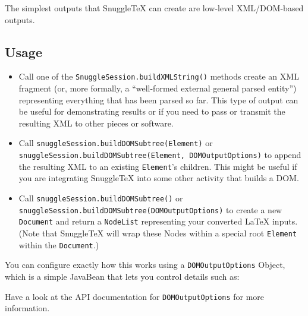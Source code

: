 
The simplest outputs that SnuggleTeX can create are low-level XML/DOM-based outputs.

\subsection*{Usage}

\begin{itemize}
  \item
    Call one of the \verb|SnuggleSession.buildXMLString()| methods create an XML fragment
    (or, more formally, a ``well-formed external general parsed entity'')
    representing everything that has been parsed so far.
    This type of output can be useful for demonstrating results or if you need to pass or
    transmit the resulting XML to other pieces or software.

  \item
    Call \verb|snuggleSession.buildDOMSubtree(Element)|
    or \verb|snuggleSession.buildDOMSubtree(Element, DOMOutputOptions)|
    to append the resulting XML to an existing \verb|Element|'s children.
    This might be useful if you are integrating SnuggleTeX into some other activity
    that builds a DOM.

  \item
    Call \verb|snuggleSession.buildDOMSubtree()|
    or \verb|snuggleSession.buildDOMSubtree(DOMOutputOptions)|
    to create a new \verb|Document| and return a \verb|NodeList| representing
    your converted LaTeX inputs. (Note that SnuggleTeX will wrap these Nodes
    within a special root \verb|Element| within the \verb|Document|.)

\end{itemize}

You can configure exactly how this works using a \verb|DOMOutputOptions| Object,
which is a simple JavaBean that lets you control details such as:


Have a look at the API documentation for \verb|DOMOutputOptions| for more information.
